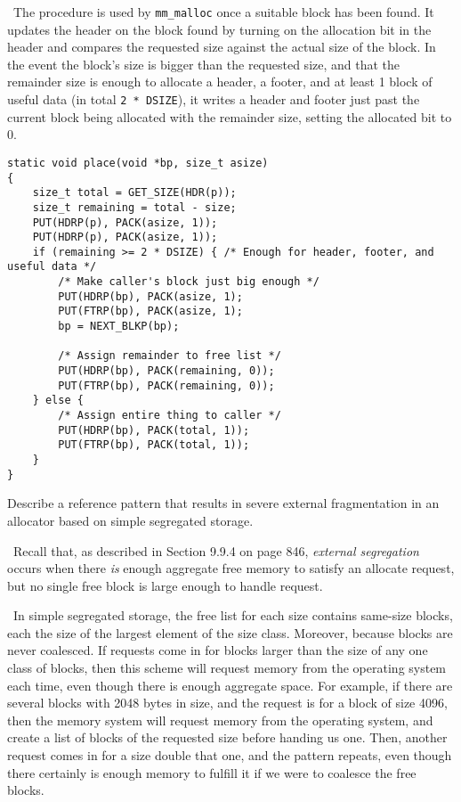\documentclass[12pt]{article}
\newenvironment{ex}[2][Exercise]{\begin{trivlist}
		\item[\hskip \labelsep {\bfseries #1}\hskip \labelsep {\bfseries #2.}]}{\end{trivlist}}
\newenvironment{sol}[1][Solution]{\begin{trivlist}
		\item[\hskip \labelsep {\bfseries #1:}]}{\end{trivlist}}
\begin{document}
\begin{sol}
	\
	The procedure is used by \texttt{mm\_malloc} once a suitable block has been found.
	It updates the header on the block found by turning on the allocation bit in the header and
	compares the requested size against the actual size of the block. In the event the block's	
	size is bigger than the requested size, and that the remainder size is enough to allocate a header,
	a footer, and at least 1 block of useful data (in total \texttt{2 * DSIZE}), it writes a
	header and footer just past the current block being allocated with the remainder size, setting
	the allocated bit to 0.
	\begin{lstlisting}
static void place(void *bp, size_t asize)
{
	size_t total = GET_SIZE(HDR(p));
	size_t remaining = total - size;
	PUT(HDRP(p), PACK(asize, 1));
	PUT(HDRP(p), PACK(asize, 1));
	if (remaining >= 2 * DSIZE) { /* Enough for header, footer, and useful data */
		/* Make caller's block just big enough */
		PUT(HDRP(bp), PACK(asize, 1);
		PUT(FTRP(bp), PACK(asize, 1);
		bp = NEXT_BLKP(bp);
		
		/* Assign remainder to free list */
		PUT(HDRP(bp), PACK(remaining, 0));
		PUT(FTRP(bp), PACK(remaining, 0));
	} else {
		/* Assign entire thing to caller */
		PUT(HDRP(bp), PACK(total, 1));
		PUT(FTRP(bp), PACK(total, 1));
	}
}
	\end{lstlisting}
\end{sol}

\begin{ex}{9.10}
	Describe a reference pattern that results in severe external fragmentation in an allocator
	based on simple segregated storage.
\end{ex}

\begin{sol}
	\
	Recall that, as described in Section 9.9.4 on page 846, \emph{external segregation} occurs
	when there \emph{is} enough aggregate free memory to satisfy an allocate request, but no
	single free block is large enough to handle request.
	
	\
	In simple segregated storage, the free list for each size contains same-size blocks, each the
	size of the largest element of the size class. Moreover, because blocks are never coalesced.
	If requests come in for blocks larger than the size of any one class of blocks, then this
	scheme will request memory from the operating system each time, even though there is enough
	aggregate space. For example, if there are several blocks with 2048 bytes in size, and
	the request is for a block of size 4096, then the memory system will request memory from
	the operating system, and create a list of blocks of the requested size before handing us one.
	Then, another request comes in for a size double that one, and the pattern repeats, even
	though there certainly is enough memory to fulfill it if we were to coalesce the free
	blocks.
\end{sol}
\end{document}
